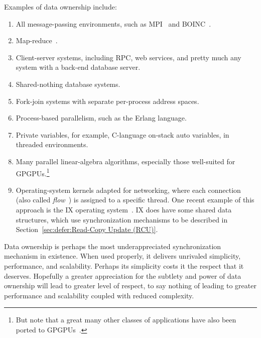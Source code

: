 Examples of data ownership include:

\begin{enumerate}
\item	All message-passing environments, such as MPI~\cite{MPIForum2008}
	and BOINC~\cite{BOINC2008}.
\item	Map-reduce~\cite{MapReduce2008MIT}.
\item	Client-server systems, including RPC, web services, and
	pretty much any system with a back-end database server.
\item	Shared-nothing database systems.
\item	Fork-join systems with separate per-process address spaces.
\item	Process-based parallelism, such as the Erlang language.
\item	Private variables, for example, C-language on-stack auto variables,
	in threaded environments.
\item	Many parallel linear-algebra algorithms, especially those
	well-suited for GPGPUs.\footnote{
		But note that a great many other classes of applications
		have also been ported to
		GPGPUs~\cite{NormMatloff2013ParProcBook,AMD2017OpenCL,NVidia2017GPGPU,NVidia2017GPGPU-university}.}
\item	Operating-system kernels adapted for networking, where each connection
	(also called \emph{flow}~\cite{Shenker89,ZhangPhD,McKenney90})
	is assigned to a specific thread.
	One recent example of this approach is the IX operating
	system~\cite{Belay:2016:IOS:3014162.2997641}.
	IX does have some shared data structures, which use synchronization
	mechanisms to be described in
	Section~\ref{sec:defer:Read-Copy Update (RCU)}.
\end{enumerate}

Data ownership is perhaps the most underappreciated synchronization
mechanism in existence.
When used properly, it delivers unrivaled simplicity, performance,
and scalability.
Perhaps its simplicity costs it the respect that it deserves.
Hopefully a greater appreciation for the subtlety and power of data ownership
will lead to greater level of respect, to say nothing of leading to
greater performance and scalability coupled with reduced complexity.

